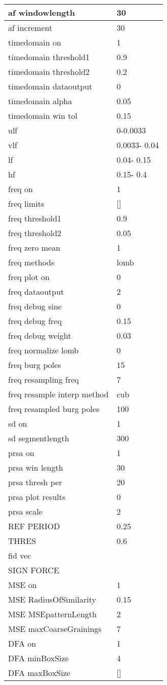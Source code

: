 \begin{tabular}{|l|l|}
af windowlength&30\\\hline
af increment&30\\\hline
timedomain on&1\\\hline
timedomain threshold1&0.9\\\hline
timedomain threshold2&0.2\\\hline
timedomain dataoutput&0\\\hline
timedomain alpha&0.05\\\hline
timedomain win tol&0.15\\\hline
ulf&     0-0.0033\\\hline
vlf&0.0033-  0.04\\\hline
lf&  0.04-  0.15\\\hline
hf&  0.15-   0.4\\\hline
freq on&1\\\hline
freq limits&[]\\\hline
freq threshold1&0.9\\\hline
freq threshold2&0.05\\\hline
freq zero mean&1\\\hline
freq methods&lomb\\\hline
freq plot on&0\\\hline
freq dataoutput&2\\\hline
freq debug sine&0\\\hline
freq debug freq&0.15\\\hline
freq debug weight&0.03\\\hline
freq normalize lomb&0\\\hline
freq burg poles&15\\\hline
freq resampling freq&7\\\hline
freq resample interp method&cub\\\hline
freq resampled burg poles&100\\\hline
sd on&1\\\hline
sd segmentlength&300\\\hline
prsa on&1\\\hline
prsa win length&30\\\hline
prsa thresh per&20\\\hline
prsa plot results&0\\\hline
prsa scale&2\\\hline
REF PERIOD&0.25\\\hline
THRES&0.6\\\hline
fid vec&\\\hline
SIGN FORCE&\\\hline
MSE on&1\\\hline
MSE RadiusOfSimilarity&0.15\\\hline
MSE MSEpatternLength&2\\\hline
MSE maxCoarseGrainings&7\\\hline
DFA on&1\\\hline
DFA minBoxSize&4\\\hline
DFA maxBoxSize&[]\\\hline
\end{tabular}
